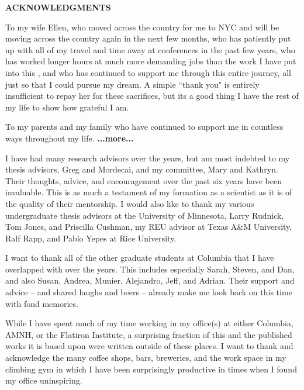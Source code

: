 %
%
%
%

\newpage

\begin{center}

{\large \bf ACKNOWLEDGMENTS } %

\end{center}

\vspace{0.8cm}

To my wife Ellen, who moved across the country for me to NYC and will be moving
across the country again in the next few months, who has patiently put up with
all of my travel and time away at conferences in the past few years,
who has worked longer hours at much more demanding jobs than the work I have put
into this \dissertation, and who has continued to support me through this
entire journey, all just so that I could pursue my dream. A simple ``thank you" is
entirely insufficient to repay her for these sacrifices, but its a good thing
I have the rest of my life to show how grateful I am.

To my parents and my family who have continued to support me in countless ways
throughout my life. \textbf{...more...}

I have had many research advisors over the years, but am most indebted to
my thesis advisors, Greg and Mordecai, and my committee, Mary and Kathryn. Their
thoughts, advice, and encouragement over the past six years have been invaluable.
This \dissertation  is as much a testament of my formation as a scientist as it
is of the quality of their mentorship. I would also like to thank my various
undergraduate thesis advisors at the University of Minnesota,
Larry Rudnick, Tom Jones, and Priscilla Cushman, my REU advisor at
Texas A\&M University, Ralf Rapp, and Pablo Yepes at Rice University.

I want to thank all of the other graduate students at Columbia that I have overlapped
with over the years. This includes especially Sarah, Steven, and Dan,
and also Susan, Andrea, Munier, Alejandro, Jeff, and Adrian.
Their support and advice -- and shared laughs and beers --
already make me look back on this time with fond memories.

While I have spent much of my time working in my office(s) at either Columbia,
AMNH, or the Flatiron Institute, a surprising fraction of this \dissertation
and the published works it is based upon were written outside of these
places. I want to thank and acknowledge the many coffee shops, bars, breweries,
and the work space in my climbing gym in which I have been
surprisingly productive in times when I found my office uninspiring.

